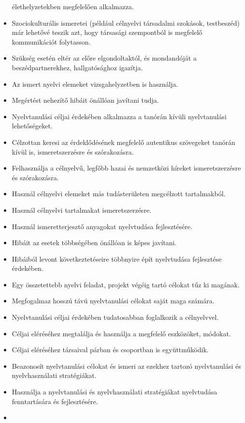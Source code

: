 \begin{itemize}
  élethelyzetekben megfelelően alkalmazza.
\item
  Szociokulturális ismeretei (például célnyelvi társadalmi szokások,
  testbeszéd) már lehetővé teszik azt, hogy társasági szempontból is
  megfelelő kommunikációt folytasson.
\item
  Szükség esetén eltér az előre elgondoltaktól, és mondandóját a
  beszédpartnerekhez, hallgatósághoz igazítja.
\item
  Az ismert nyelvi elemeket vizsgahelyzetben is használja.
\item
  Megértést nehezítő hibáit önállóan javítani tudja.
\item
  Nyelvtanulási céljai érdekében alkalmazza a tanórán kívüli
  nyelvtanulási lehetőségeket.
\item
  Célzottan keresi az érdeklődésének megfelelő autentikus szövegeket
  tanórán kívül is, ismeretszerzésre és szórakozásra.
\item
  Felhasználja a célnyelvű, legfőbb hazai és nemzetközi híreket
  ismeretszerzésre és szórakozásra.
\item
  Használ célnyelvi elemeket más tudásterületen megcélzott tartalmakból.
\item
  Használ célnyelvi tartalmakat ismeretszerzésre.
\item
  Használ ismeretterjesztő anyagokat nyelvtudása fejlesztésére.
\item
  Hibáit az esetek többségében önállóan is képes javítani.
\item
  Hibáiból levont következtetéseire többnyire épít nyelvtudása
  fejlesztése érdekében.
\item
  Egy összetettebb nyelvi feladat, projekt végéig tartó célokat tűz ki
  magának.
\item
  Megfogalmaz hosszú távú nyelvtanulási célokat saját maga számára.
\item
  Nyelvtanulási céljai érdekében tudatosabban foglalkozik a célnyelvvel.
\item
  Céljai eléréséhez megtalálja és használja a megfelelő eszközöket,
  módokat.
\item
  Céljai eléréséhez társaival párban és csoportban is együttműködik.
\item
  Beazonosít nyelvtanulási célokat és ismeri az ezekhez tartozó
  nyelvtanulási és nyelvhasználati stratégiákat.
\item
  Használja a nyelvtanulási és nyelvhasználati stratégiákat nyelvtudása
  fenntartására és fejlesztésére.
\item

\end{itemize}
